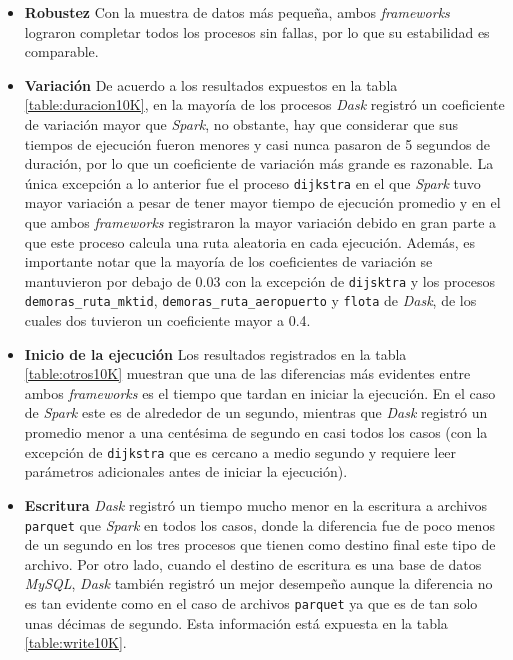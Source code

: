 \begin{itemize}
	
	\item \textbf{Robustez} Con la muestra de datos más pequeña, ambos \textit{frameworks} lograron completar todos los procesos sin fallas, por lo que su estabilidad es comparable.
	
	\item \textbf{Variación} De acuerdo a los resultados expuestos en la tabla \ref{table:duracion10K}, en la mayoría de los procesos \textit{Dask} registró un coeficiente de variación mayor que \textit{Spark}, no obstante, hay que considerar que sus tiempos de ejecución fueron menores y casi nunca pasaron de 5 segundos de duración, por lo que un coeficiente de variación más grande es razonable. La única excepción a lo anterior fue el proceso \texttt{dijkstra} en el que \textit{Spark} tuvo mayor variación a pesar de tener mayor tiempo de ejecución promedio y en el que ambos \textit{frameworks} registraron la mayor variación debido en gran parte a que este proceso calcula una ruta aleatoria en cada ejecución. Además, es importante notar que la mayoría de los coeficientes de variación se mantuvieron por debajo de 0.03 con la excepción de \texttt{dijsktra} y los procesos \texttt{demoras\_ruta\_mktid}, \texttt{demoras\_ruta\_aeropuerto} y \texttt{flota} de \textit{Dask}, de los cuales dos tuvieron un coeficiente mayor a 0.4.
	
	\item \textbf{Inicio de la ejecución} Los resultados registrados en la tabla \ref{table:otros10K} muestran que una de las diferencias más evidentes entre ambos \textit{frameworks} es el tiempo que tardan en iniciar la ejecución. En el caso de \textit{Spark} este es de alrededor de un segundo, mientras que \textit{Dask} registró un promedio menor a una centésima de segundo en casi todos los casos (con la excepción de \texttt{dijkstra} que es cercano a medio segundo y requiere leer parámetros adicionales antes de iniciar la ejecución).
	
	\item \textbf{Escritura} \textit{Dask} registró un tiempo mucho menor en la escritura a archivos \texttt{parquet} que \textit{Spark} en todos los casos, donde la diferencia fue de poco menos de un segundo en los tres procesos que tienen como destino final este tipo de archivo. Por otro lado, cuando el destino de escritura es una base de datos \textit{MySQL}, \textit{Dask} también registró un mejor desempeño aunque la diferencia no es tan evidente como en el caso de archivos \texttt{parquet} ya que es de tan solo unas décimas de segundo. Esta información está expuesta en la tabla \ref{table:write10K}.
	

\end{itemize}
